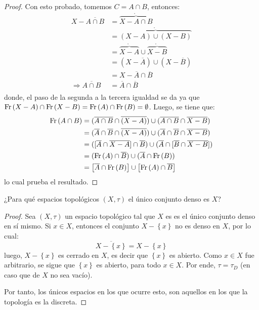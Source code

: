 \documentclass[12pt]{report}
\theoremstyle{largebreak}
\newcommand{\Int}[1]{\ensuremath{\mathring{#1}}}
\newcommand{\Cls}[1]{\ensuremath{\overline{#1}}}
\newcommand{\Fr}[1]{\ensuremath{\textup{Fr}\left(#1\right)}}
\begin{document}
\begin{proof}
        Con esto probado, tomemos $C=A\cap B$, entonces:
        \begin{equation*}
            \begin{split}
                X-\Cls{A\cap B}&=\Int{\overbrace{X-A\cap B}}\\
                &=\Int{\overbrace{(X-A)\cup (X-B)}}\\
                &=\Int{\overbrace{X-A}}\cup\Int{\overbrace{X-B}}\\
                &=(X-\Cls{A})\cup(X-\Cls{B})\\
                &=X-\Cls{A}\cap\Cls{B}\\
                \Rightarrow \Cls{A\cap B}&=\Cls{A}\cap\Cls{B}\\
            \end{split}
        \end{equation*}
        donde, el paso de la segunda a la tercera igualdad se da ya que $\Fr{X-A}\cap\Fr{X-B}=\Fr{A}\cap\Fr{B}=\emptyset$. Luego, se tiene que:
        \begin{equation*}
            \begin{split}
                \Fr{A\cap B}&=(\Cls{A\cap B}\cap\Cls{(X-A)})\cup(\Cls{A\cap B}\cap\Cls{X-B})\\
                &=(\Cls{A}\cap\Cls{B} \cap\Cls{(X-A)})\cup(\Cls{A}\cap\Cls{B}\cap\Cls{X-B})\\
                &=([\Cls{A}\cap\Cls{X-A}]\cap\Cls{B})\cup(\Cls{A}\cap[\Cls{B}\cap\Cls{X-B}])\\
                &=(\Fr{A}\cap\Cls{B})\cup(\Cls{A}\cap\Fr{B})\\
                &=\left[\Cls{A}\cap\Fr{B}\right]\cup\left[\Fr{A}\cap\Cls{B}\right]\\
            \end{split}
        \end{equation*}
        lo cual prueba el resultado.
    \end{proof}

    \begin{excer}
        ¿Para qué espacios topológicos $(X,\tau)$ el único conjunto denso es $X$?
    \end{excer}

    \begin{proof}
        Sea $(X,\tau)$ un espacio topológico tal que $X$ es es el único conjunto denso en sí mismo. Si $x\in X$, entonces el conjunto $X-\left\{x \right\}$ no es denso en $X$, por lo cual:
        \begin{equation*}
            \Cls{X-\left\{x\right\}}=X-\left\{x\right\}
        \end{equation*}
        luego, $X-\left\{x \right\}$ es cerrado en $X$, es decir que $\left\{x\right\}$ es abierto. Como $x\in X$ fue arbitrario, se sigue que $\left\{ x\right\}$ es abierto, para todo $x\in X$. Por ende, $\tau=\tau_D$ (en caso que de $X$ no sea vacío).

        Por tanto, los únicos espacios en los que ocurre esto, son aquellos en los que la topología es la discreta.
    \end{proof}
\end{document}
